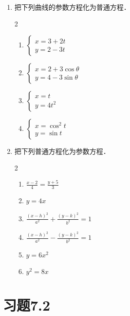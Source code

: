 \begin{ex}
\begin{enumerate}
    \item 把下列曲线的参数方程化为普通方程．
    \begin{multicols}{2}
\begin{enumerate}
    \item $\begin{cases}
        x=3+2t\\y=2-3t
    \end{cases}$
    \item $\begin{cases}
        x=2+3\cos\theta\\
        y=4-3\sin\theta
    \end{cases}$
    \item $\begin{cases}
        x=t\\y=4t^2
    \end{cases}$
    \item $\begin{cases}
        x=\cos^2 t\\ y=\sin t
    \end{cases}$
\end{enumerate}
    \end{multicols}

\item 把下列普通方程化为参数方程．
\begin{multicols}{2}
\begin{enumerate}
    \item $\frac{x-2}{4}=\frac{y+5}{3}$
    \item $y=4x$
    \item $\frac{(x-h)^2}{a^2}+\frac{(y-k)^2}{b^2}=1$
    \item $\frac{(x-h)^2}{a^2}-\frac{(y-k)^2}{b^2}=1$
    \item $y=6x^2$
    \item $y^2=8x$
\end{enumerate}
\end{multicols}
\end{enumerate}
\end{ex}

\section*{习题7.2}

